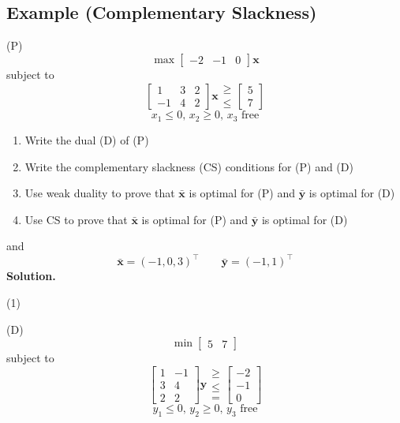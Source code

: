 \subsection{Example (Complementary Slackness)}
(P)
\[ \max
\begin{bmatrix}
    -2 & -1 & 0
\end{bmatrix}\bm{x} \]
subject to
\[
\begin{bmatrix}
    1 & 3 & 2\\
    -1 & 4 & 2
\end{bmatrix}\bm{x}
\begin{matrix}
    \ge\\
    \le
\end{matrix}
\begin{bmatrix}
    5\\
    7
\end{bmatrix}\]
\[ x_1\le 0,\,x_2\ge 0,\,x_3\text{ free} \]
\begin{enumerate}[(1)]
    \item Write the dual (D) of (P)
    \item Write the complementary slackness (CS) conditions for (P) and (D)
    \item Use weak duality to prove that $ \bm{\bar{x}} $ is optimal for (P)
    and $ \bm{\bar{y}} $ is optimal for (D)
    \item Use CS to prove that $ \bm{\bar{x}} $ is optimal for (P) and
    $ \bm{\bar{y}} $ is optimal for (D)
\end{enumerate}
and
\[ \bm{\bar{x}}=(-1,0,3)^\top\qquad \bm{\bar{y}}=(-1,1)^\top \]
\textbf{Solution.}

(1)

(D)
\[ \min
\begin{bmatrix}
    5 & 7
\end{bmatrix} \]
subject to
\[
\begin{bmatrix}
    1 & -1\\
    3 & 4\\
    2 & 2
\end{bmatrix}\bm{y}
\begin{matrix}
    \ge\\
    \le\\
    =
\end{matrix}
\begin{bmatrix}
    -2\\
    -1\\
    0
\end{bmatrix}\]
\[ y_1\le 0,\,y_2\ge 0,\,y_3\text{ free} \]

